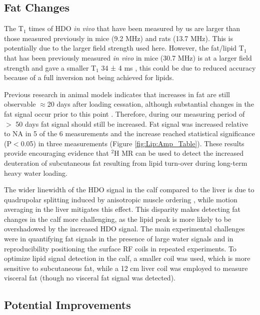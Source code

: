 \documentclass[class=article, crop=false]{standalone}
\begin{document}
\subsection{Fat Changes}

The T$_1$ times of HDO \textit{in vivo} that have been measured by us are larger than those measured previously in mice \cite{Fung1979StudyWater} (9.2 MHz) and rats \cite{Block1987COMMUNICATIONSTissues} (13.7 MHz). This is potentially due to the larger field strength used here. However, the fat/lipid T$_1$ that has been previously measured \textit{in vivo} in mice (30.7 MHz) is at a larger field strength and gave a smaller T$_1$ 34 ± 4 ms \cite{Brereton1986PreliminarySpectroscopy}, this could be due to reduced accuracy because of a full inversion not being achieved for lipids. 

Previous research in animal models indicates that increases in fat are still observable $\approx$20 days after loading cessation, although substantial changes in the fat signal occur prior to this point \cite{Brereton1986PreliminarySpectroscopy}. Therefore, during our measuring period of $>$ 50 days fat signal should still be increased. Fat signal was increased relative to NA in 5 of the 6 measurements and the increase reached statistical significance (P$<$0.05) in three measurements (Figure \ref{fig:Lip:Amp_Table}). These results provide encouraging evidence that $^2$H MR can be used to detect the increased deuteration of subcutaneous fat resulting from lipid turn-over during long-term heavy water loading. 

The wider linewidth of the HDO signal in the calf compared to the liver is due to quadrupolar splitting induced by anisotropic muscle ordering \cite{Gursan2022ResidualMuscle}, while motion averaging in the liver mitigates this effect. This disparity makes detecting fat changes in the calf more challenging, as the lipid peak is more likely to be overshadowed by the increased HDO signal. The main experimental challenges were in quantifying fat signals in the presence of large water signals and in reproducibility positioning the surface RF coils in repeated experiments. To optimize lipid signal detection in the calf, a smaller coil was used, which is more sensitive to subcutaneous fat, while a 12 cm liver coil was employed to measure visceral fat (though no visceral fat signal was detected). 

\subsection{Potential Improvements}
\end{document}

